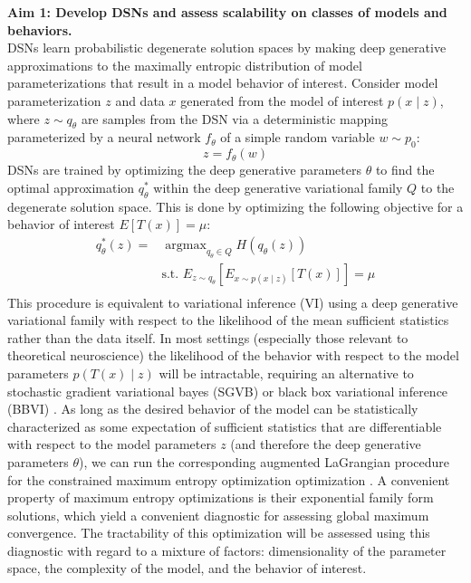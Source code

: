 \documentclass[11pt]{article}
\DeclareMathOperator*{\argmax}{argmax}
\begin{document}
\textbf{Aim 1: Develop DSNs and assess scalability on classes of models and behaviors.} \\
DSNs learn probabilistic degenerate solution spaces by making deep generative approximations to the maximally entropic distribution of model parameterizations that result in a model behavior of interest.  Consider model parameterization $z$ and data $x$ generated from the model of interest $p(x \mid z)$, where $z \sim q_{\theta}$ are samples from the DSN via a deterministic mapping parameterized by a neural network $f_\theta$ of a simple random variable $w \sim p_0$: \\
\begin{equation} z = f_{\theta}(w) \end{equation} 
 DSNs are trained by optimizing the deep generative parameters $\theta$ to find the optimal approximation $q_{\theta}^*$ within the deep generative variational family $Q$ to the degenerate solution space.  This is done by optimizing the following objective for a behavior of interest $ E\left[ T(x)\right] = \mu$:
\begin{equation}
\begin{split}
q_\theta^*(z) = & \argmax_{q_\theta \in Q} H(q_\theta(z)) \\
& \text{s.t.  } E_{z \sim q_\theta}\left[ E_{x\sim p(x \mid z)}\left[T(x)\right] \right] = \mu \\
\end{split}
\end{equation}
This procedure is equivalent to variational inference (VI) using a deep generative variational family with respect to the likelihood of the mean sufficient statistics rather than the data itself.  In most settings (especially those relevant to theoretical neuroscience) the likelihood of the behavior with respect to the model parameters $p(T(x) \mid z)$ will be intractable, requiring an alternative to stochastic gradient variational bayes (SGVB) \cite{kingma2013auto} or black box variational inference (BBVI) \cite{ranganath2014black}. As long as the desired behavior of the model can be statistically characterized as some expectation of sufficient statistics that are differentiable with respect to the model parameters $z$ (and therefore the deep generative parameters $\theta$), we can run the corresponding augmented LaGrangian procedure for the constrained maximum entropy optimization optimization \cite{loaiza2017maximum}.  A convenient property of maximum entropy optimizations is their exponential family form solutions, which yield a convenient diagnostic for assessing global maximum convergence. The tractability of this optimization will be assessed using this diagnostic with regard to a mixture of factors: dimensionality of the parameter space, the complexity of the model, and the behavior of interest.
\end{document}
